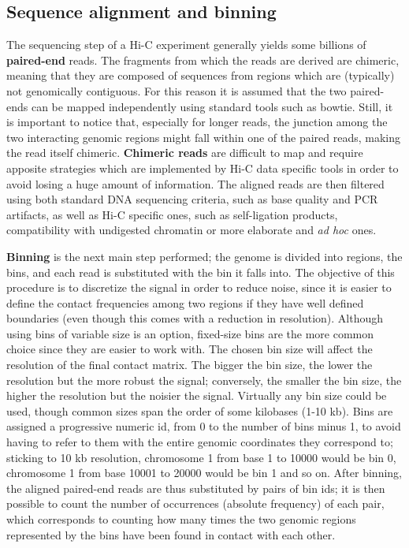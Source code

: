 \subsection{Sequence alignment and binning}
The sequencing step of a Hi-C experiment generally yields some billions of \textbf{paired-end} reads. The fragments from which the reads are derived are chimeric, meaning that they are composed of sequences from regions which are (typically) not genomically contiguous. For this reason it is assumed that the two paired-ends can be mapped independently using standard tools such as bowtie. Still, it is important to notice that, especially for longer reads, the junction among the two interacting genomic regions might fall within one of the paired reads, making the read itself chimeric. \textbf{Chimeric reads} are difficult to map and require apposite strategies which are implemented by Hi-C data specific tools in order to avoid losing a huge amount of information. The aligned reads are then filtered using both standard DNA sequencing criteria, such as base quality and PCR artifacts, as well as Hi-C specific ones, such as self-ligation products, compatibility with undigested chromatin\cite{readfiltering2013} or more elaborate and \emph{ad hoc} ones\cite{complexfiltering2017}.

\textbf{Binning} is the next main step performed; the genome is divided into regions, the bins, and each read is substituted with the bin it falls into. The objective of this procedure is to discretize the signal in order to reduce noise, since it is easier to define the contact frequencies among two regions if they have well defined boundaries (even though this comes with a reduction in resolution).
Although using bins of variable size is an option, fixed-size bins are the more common choice since they are easier to work with. The chosen bin size will affect the resolution of the final contact matrix. The bigger the bin size, the lower the resolution but the more robust the signal; conversely, the smaller the bin size, the higher the resolution but the noisier the signal. Virtually any bin size could be used, though common sizes span the order of some kilobases (1-10 kb). Bins are assigned a progressive numeric id, from 0 to the number of bins minus 1, to avoid having to refer to them with the entire genomic coordinates they correspond to; sticking to 10 kb resolution, chromosome 1 from base 1 to 10000 would be bin 0, chromosome 1 from base 10001 to 20000 would be bin 1 and so on. After binning, the aligned paired-end reads are thus substituted by pairs of bin ids; it is then possible to count the number of occurrences (absolute frequency) of each pair, which corresponds to counting how many times the two genomic regions represented by the bins have been found in contact with each other. 

